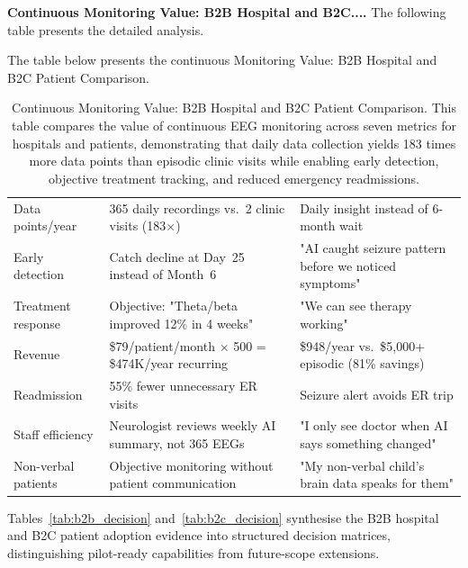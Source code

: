 \noindent\textbf{Continuous Monitoring Value: B2B Hospital and B2C....} The following table presents the detailed analysis.

\noindent The table below presents the continuous Monitoring Value: B2B Hospital and B2C Patient Comparison.

\begin{table}[H]
\tablestripes\tablefontsize
\tablefontsize
\caption[Continuous Monitoring Value: B2B Hospital and B2C]{Continuous Monitoring Value: B2B Hospital and B2C Patient Comparison. This table compares the value of continuous EEG monitoring across seven metrics for hospitals and patients, demonstrating that daily data collection yields 183 times more data points than episodic clinic visits while enabling early detection, objective treatment tracking, and reduced emergency readmissions.}
\begin{tabularx}{\textwidth}{@{} p{2.5cm} L L @{}}
\toprule
{} &  &  \\
\midrule
Data points/year & 365 daily recordings vs.\ 2 clinic visits (183$\times$) & Daily insight instead of 6-month wait \\
\addlinespace
Early detection & Catch decline at Day~25 instead of Month~6 & "AI caught seizure pattern before we noticed symptoms" \\
\addlinespace
Treatment response & Objective: "Theta/beta improved 12\% in 4 weeks" & "We can see therapy working" \\
\addlinespace
Revenue & \$79/patient/month $\times$ 500 = \$474K/year recurring & \$948/year vs.\ \$5,000+ episodic (81\% savings) \\
\addlinespace
Readmission & 55\% fewer unnecessary ER visits & Seizure alert avoids ER trip \\
\addlinespace
Staff efficiency & Neurologist reviews weekly AI summary, not 365 EEGs & "I only see doctor when AI says something changed" \\
\addlinespace
Non-verbal patients & Objective monitoring without patient communication & "My non-verbal child's brain data speaks for them" \\
\bottomrule
\end{tabularx}
\end{table}

Tables~\ref{tab:b2b_decision} and~\ref{tab:b2c_decision} synthesise the B2B hospital and B2C patient adoption evidence into structured decision matrices, distinguishing pilot-ready capabilities from future-scope extensions.

